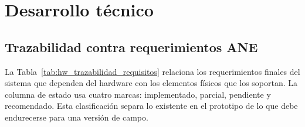 \section{Desarrollo técnico}

\subsection{Trazabilidad contra requerimientos ANE}

La Tabla~\ref{tab:hw_trazabilidad_requisitos} relaciona los requerimientos
finales del sistema que dependen del hardware con los elementos físicos que los
soportan. La columna de estado usa cuatro marcas: implementado, parcial,
pendiente y recomendado. Esta clasificación separa lo existente en el prototipo de
lo que debe endurecerse para una versión de campo.

